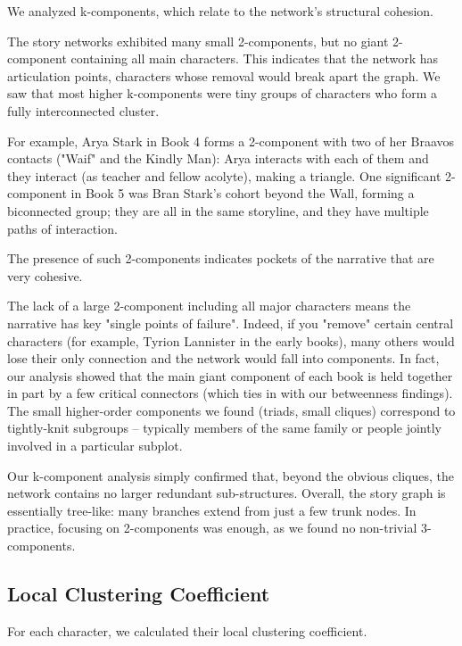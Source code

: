 \documentclass[12pt, a4paper]{article}
\begin{document}
	We analyzed k-components, which relate to the network's structural cohesion.
	
	The story networks exhibited many small 2-components,
       but no giant 2-component containing all main characters.
        This indicates that the network has articulation points, 
        characters whose removal would break apart the graph. 
	We saw that most higher k-components were tiny groups of 
      characters who form a fully interconnected cluster. 
	
	For example, Arya Stark in Book 4 forms a 2-component with 
      two of her Braavos contacts ("Waif" and the Kindly Man): 
      Arya interacts with each of them and they interact 
      (as teacher and fellow acolyte), making a triangle. 
      One significant 2-component in Book 5 was Bran Stark's 
      cohort beyond the Wall, forming a biconnected group; 
      they are all in the same storyline, and they have multiple 
      paths of interaction. 
	
	The presence of such 2-components indicates pockets of 
      the narrative that are very cohesive. 
	
	The lack of a large 2-component including all major 
      characters means the narrative has key "single points 
      of failure". Indeed, if you "remove" certain central 
      characters (for example, Tyrion Lannister in the early books), 
      many others would lose their only connection and the network 
      would fall into components. In fact, our analysis showed that 
      the main giant component of each book is held together in 
      part by a few critical connectors (which ties in with our 
      betweenness findings). The small higher-order components 
      we found (triads, small cliques) correspond to tightly-knit 
      subgroups – typically members of the same family or people 
      jointly involved in a particular subplot.
	
	Our k-component analysis simply confirmed that, beyond 
      the obvious cliques, the network contains no larger 
      redundant sub-structures. Overall, the story graph 
      is essentially tree-like: many branches extend from 
      just a few trunk nodes. In practice, focusing on 
      2-components was enough, as we found no non-trivial 
      3-components.
	

	
	\subsection*{Local Clustering Coefficient}
	For each character, we calculated their local clustering coefficient.
	
\end{document}
